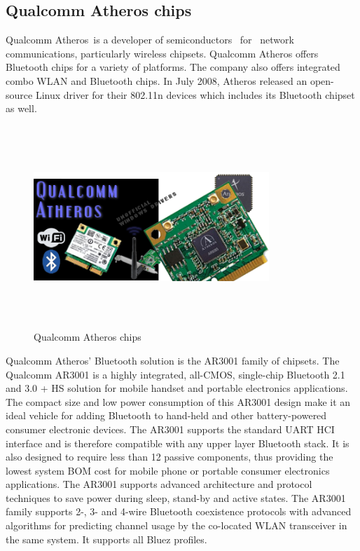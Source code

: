 \subsection{Qualcomm Atheros chips}
Qualcomm Atheros is a developer of  semiconductors  for  network  communications, particularly wireless chipsets. Qualcomm Atheros offers Bluetooth chips for a variety of platforms. The company also offers integrated combo WLAN and Bluetooth chips. In July 2008, Atheros released an open-source Linux driver for their 802.11n devices which includes its Bluetooth chipset as well. 
\begin{figure}[ht]
	\centering
	\includegraphics[width=3.5in, height=3in]{images/qualcomm_atheros.png}
	\caption{Qualcomm Atheros chips}
\end{figure}
Qualcomm Atheros’ Bluetooth solution is the AR3001 family of chipsets. The Qualcomm AR3001 is a highly integrated, all-CMOS, single-chip Bluetooth 2.1 and 3.0 + HS solution for mobile handset and portable electronics applications. The compact size and low power consumption of this AR3001 design make it an ideal vehicle for adding Bluetooth to hand-held and other battery-powered consumer electronic devices. The AR3001 supports the standard UART HCI interface and is therefore compatible with any upper layer Bluetooth stack. It is also designed to require less than 12 passive components, thus providing the lowest system BOM cost for mobile phone or portable consumer electronics applications. The AR3001 supports advanced architecture and protocol techniques to save power during sleep, stand-by and active states. The AR3001 family supports 2-, 3- and 4-wire Bluetooth coexistence protocols with advanced algorithms for predicting channel usage by the co-located WLAN transceiver in the same system. It supports all Bluez profiles. 
